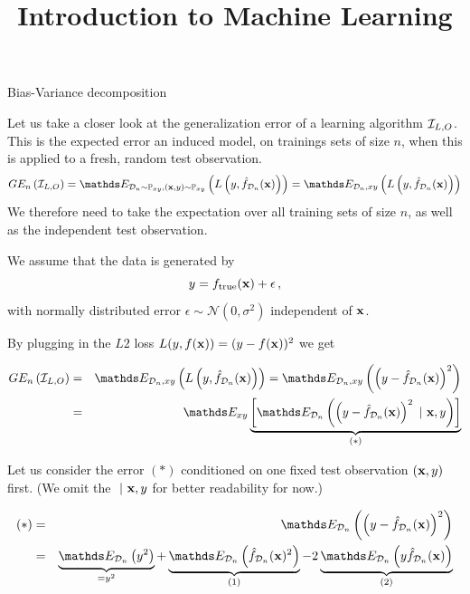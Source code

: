 \documentclass[11pt,compress,t,notes=noshow, xcolor=table]{beamer}
\title{Introduction to Machine Learning}
\date{}
\begin{document}




\begin{vbframe} {Bias-Variance decomposition}

Let us take a closer look at the generalization error of a learning algorithm $\mathcal{I}_{L, O}$.
This is the expected error an induced model, on trainings sets of size $n$, when this is applied to a fresh, random test observation.
  $$\GEind = \E_{\D_n \sim \Pxy, (\xv, y) \sim \Pxy}\left( L\left(y, \fh_{\D_n}(\xv)\right) \right) = \E_{\D_n, xy}\left( L\left(y, \fh_{\D_n}(\xv)\right) \right)  $$
We therefore need to take the expectation over all training sets of size $n$, as well as the independent test observation.

\lz 

We assume that the data is generated by 
$$
y = f_{\text{true}}(\mathbf{x}) + \epsilon\,,
$$
with normally distributed error $\epsilon \sim \mathcal{N}(0, \sigma^2)$ independent of $\mathbf{x}$.  

\framebreak 

By plugging in the $L2$ loss $L(y, f(\mathbf{x})) = (y - f(\mathbf{x}))^2$ we get

\begin{footnotesize}
\begin{eqnarray*}
\GEind &=& \E_{\D_n, xy}\left( L\left(y, \fh_{\D_n}(\xv)\right)\right) = \E_{\D_n, xy}\left(\left(y - \fh_{\D_n}(\xv)\right)^2\right) \\
&=& \E_{xy}\underbrace{\left[\E_{\D_n}\left(\left(y - \fh_{\D_n}(\xv)\right)^2~|~ \xv, y\right)\right]}_{(*)} 
\end{eqnarray*}
\end{footnotesize}

Let us consider the error $(*)$ conditioned on one fixed test observation $(\mathbf{x}, y)$ first. (We omit the $~|~\mathbf{x}, y$ for better readability for now.)

\begin{footnotesize}
\begin{eqnarray*}
(*) &=& \E_{\D_n}\left(\left(y - \fh_{\D_n}(\xv)\right)^2\right)\\
&=& \underbrace{\E_{\D_n}\left(y^2\right)}_{= y^2} + \underbrace{\E_{\D_n}\left(\fh_{\D_n}(\xv)^2\right)}_{(1)}  - 2\underbrace{\E_{\D_n}\left(y\fh_{\D_n}(\xv)\right)}_{(2)} 
\end{eqnarray*}
\end{footnotesize}


\end{vbframe}
\end{document}
